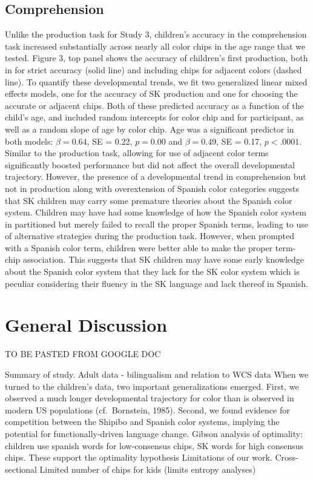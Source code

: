 \documentclass[
  english,
  ,man,floatsintext]{apa6}
\begin{document}
\hypertarget{comprehension-1}{%
\subsection{Comprehension}\label{comprehension-1}}

Unlike the production task for Study 3, children's accuracy in the comprehension task increased substantially across nearly all color chips in the age range that we tested. Figure 3, top panel shows the accuracy of children's first production, both in for strict accuracy (solid line) and including chips for adjacent colors (dashed line). To quantify these developmental trends, we fit two generalized linear mixed effects models, one for the accuracy of SK production and one for choosing the accurate or adjacent chips. Both of these predicted accuracy as a function of the child's age, and included random intercepts for color chip and for participant, as well as a random slope of age by color chip. Age was a significant predictor in both models: \(\beta = 0.64\), SE = 0.22, \(p = 0.00\) and \(\beta = 0.49\), SE = 0.17, \(p < .0001\).
Similar to the production task, allowing for use of adjacent color terms significantly boosted performance but did not affect the overall developmental trajectory. However, the presence of a developmental trend in comprehension but not in production along with overextension of Spanish color categories suggests that SK children may carry some premature theories about the Spanish color system. Children may have had some knowledge of how the Spanish color system in partitioned but merely failed to recall the proper Spanish terms, leading to use of alternative strategies during the production task. However, when prompted with a Spanish color term, children were better able to make the proper term-chip association. This suggests that SK children may have some early knowledge about the Spanish color system that they lack for the SK color system which is peculiar considering their fluency in the SK language and lack thereof in Spanish.

\hypertarget{general-discussion}{%
\section{General Discussion}\label{general-discussion}}

TO BE PASTED FROM GOOGLE DOC

Summary of study.
Adult data - bilingualism and relation to WCS data
When we turned to the children's data, two important generalizations emerged. First, we observed a much longer developmental trajectory for color than is observed in modern US populations (cf.~Bornstein, 1985).
Second, we found evidence for competition between the Shipibo and Spanish color systems, implying the potential for functionally-driven language change.
Gibson analysis of optimality: children use spanish words for low-consensus chips, SK words for high consensus chips. These support the optimality hypothesis
Limitations of our work.
Cross-sectional
Limited number of chips for kids (limits entropy analyses)
\end{document}
